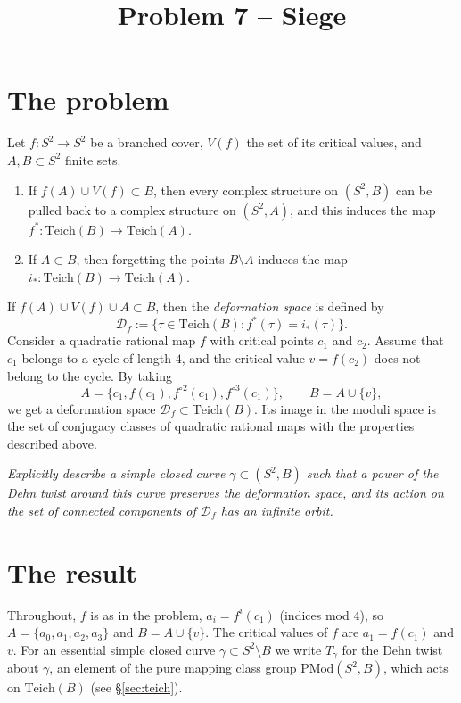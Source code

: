 \documentclass[11pt]{article}
\title{Problem 7 -- Siege}
\date{}
\author{}
\theoremstyle{definition}
\newcommand{\Teich}{\mathrm{Teich}}
\newcommand{\PMod}{\mathrm{PMod}}
\newcommand{\D}{\mathcal D}
\begin{document}
\maketitle

\section{The problem}

Let $f\colon S^2\to S^2$ be a branched cover, $V(f)$ the set of its critical values, and $A,B\subset S^2$ finite sets.
\begin{enumerate}
\item If $f(A)\cup V(f)\subset B$, then every complex structure on $(S^2,B)$ can be pulled back to a complex structure on $(S^2,A)$, and this induces the map $f^*\colon\Teich(B)\to\Teich(A)$.
\item If $A\subset B$, then forgetting the points $B\setminus A$ induces the map $i_*\colon\Teich(B)\to\Teich(A)$.
\end{enumerate}
If $f(A)\cup V(f)\cup A\subset B$, then the \emph{deformation space} is defined by
\[\D_f:=\{\tau\in\Teich(B): f^*(\tau)=i_*(\tau)\}.\]
Consider a quadratic rational map $f$ with critical points $c_1$ and $c_2$. Assume that $c_1$ belongs to a cycle of length $4$, and the critical value $v=f(c_2)$ does not belong to the cycle. By taking
\[A=\{c_1,f(c_1),f^{\circ2}(c_1),f^{\circ3}(c_1)\},\qquad B=A\cup\{v\},\]
we get a deformation space $\D_f\subset\Teich(B)$. Its image in the moduli space is the set of conjugacy classes of quadratic rational maps with the properties described above.

\emph{Explicitly describe a simple closed curve $\gamma\subset(S^2,B)$ such that a power of the Dehn twist around this curve preserves the deformation space, and its action on the set of connected components of $\D_f$ has an infinite orbit.}

\section{The result}

Throughout, $f$ is as in the problem, $a_i=f^{i}(c_1)$ (indices mod $4$), so $A=\{a_0,a_1,a_2,a_3\}$ and $B=A\cup\{v\}$. The critical values of $f$ are $a_1=f(c_1)$ and $v$. For an essential simple closed curve $\gamma\subset S^2\setminus B$ we write $T_\gamma$ for the Dehn twist about $\gamma$, an element of the pure mapping class group $\PMod(S^2,B)$, which acts on $\Teich(B)$ (see \S\ref{sec:teich}).
\end{document}
